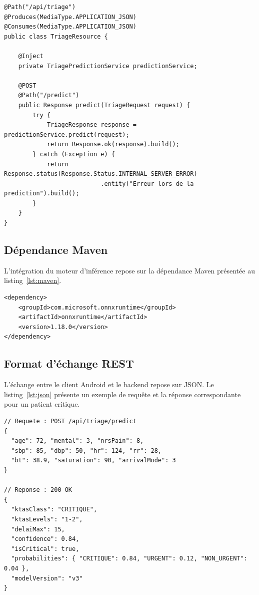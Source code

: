 \begin{listing}[H]
\begin{verbatim}
@Path("/api/triage")
@Produces(MediaType.APPLICATION_JSON)
@Consumes(MediaType.APPLICATION_JSON)
public class TriageResource {

    @Inject
    private TriagePredictionService predictionService;

    @POST
    @Path("/predict")
    public Response predict(TriageRequest request) {
        try {
            TriageResponse response = predictionService.predict(request);
            return Response.ok(response).build();
        } catch (Exception e) {
            return Response.status(Response.Status.INTERNAL_SERVER_ERROR)
                           .entity("Erreur lors de la prediction").build();
        }
    }
}
\end{verbatim}
\caption{Point d'entrée REST de prédiction (\texttt{TriageResource}).}
\label{lst:resource}
\end{listing}

\subsection{Dépendance Maven}
L'intégration du moteur d'inférence repose sur la dépendance Maven présentée au
listing~\ref{lst:maven}.

\begin{listing}[H]
\begin{verbatim}
<dependency>
    <groupId>com.microsoft.onnxruntime</groupId>
    <artifactId>onnxruntime</artifactId>
    <version>1.18.0</version>
</dependency>
\end{verbatim}
\caption{Dépendance Maven pour ONNX Runtime.}
\label{lst:maven}
\end{listing}

\subsection{Format d'échange REST}
L'échange entre le client Android et le backend repose sur JSON. Le listing~\ref{lst:json}
présente un exemple de requête et la réponse correspondante pour un patient critique.

\begin{listing}[H]
\begin{verbatim}
// Requete : POST /api/triage/predict
{
  "age": 72, "mental": 3, "nrsPain": 8,
  "sbp": 85, "dbp": 50, "hr": 124, "rr": 28,
  "bt": 38.9, "saturation": 90, "arrivalMode": 3
}

// Reponse : 200 OK
{
  "ktasClass": "CRITIQUE",
  "ktasLevels": "1-2",
  "delaiMax": 15,
  "confidence": 0.84,
  "isCritical": true,
  "probabilities": { "CRITIQUE": 0.84, "URGENT": 0.12, "NON_URGENT": 0.04 },
  "modelVersion": "v3"
}
\end{verbatim}
\caption{Exemple d'échange REST JSON (requête et réponse).}
\label{lst:json}
\end{listing}

